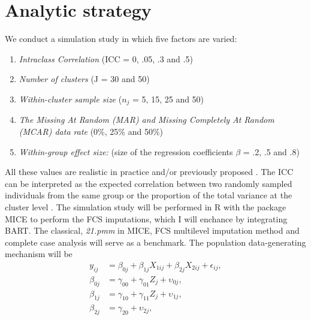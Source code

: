 \documentclass[10pt, a4paper, titlepage]{article}
\begin{document}
\section{Analytic strategy} 
We conduct a simulation study in which five factors are varied:
\begin{enumerate}
	\item \textit{Intraclass Correlation} (ICC = 0, .05, .3 and .5)
	\item \textit{Number of clusters} (J = 30 and 50)
	\item \textit{Within-cluster sample size}  ($n_{j}$ = 5, 15, 25 and 50) 
	\item \textit{The Missing At Random (MAR) and Missing Completely At Random (MCAR) data rate} (0\%, 25\% and 50\%) 
	\item \textit{Within-group effect size:} (size of the regression coefficients $\beta$ = .2, .5 and .8) 
\end{enumerate}
All these values are realistic in practice and/or previously proposed \cite{gulliford1999, murray2003, hox2017, grund2018, enders2018a, enders2020}. The ICC can be interpreted as the expected correlation between two randomly sampled individuals from the same group or the proportion of the total variance at the cluster level \cite{gulliford2005, shieh2012, hox2017}. The simulation study will be performed in R with the package MICE \cite{buuren2011} to perform the FCS imputations, which I will enchance by integrating BART. The classical, \textit{21.pmm} in MICE,  FCS multilevel imputation method \cite{ludtke2017, enders2018a, enders2020} and complete case analysis will serve as a benchmark. The population data-generating mechanism will be 
\begin{subequations}
\label{eq:population}
\begin{align}
y_{ij} &= \beta_{0j} + \beta_{1j}X_{1ij} + \beta_{2j}X_{2ij} + \epsilon_{ij}, \tag{1.1} \\ 
\beta_{0j} &= \gamma_{00} + \gamma_{01}Z_{j} + \upsilon_{0j}, \tag{1.2} \\
\beta_{1j} &= \gamma_{10} + \gamma_{11}Z_{j} + \upsilon_{1j}, \tag{1.3} \\
\beta_{2j} &= \gamma_{20} +  \upsilon_{2j}, \tag{1.4}
\end{align}
\end{subequations}
\end{document}
